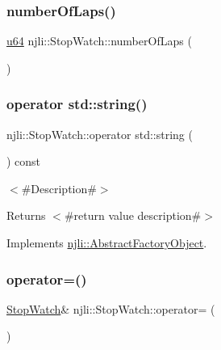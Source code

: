 \subsubsection{\texorpdfstring{number\+Of\+Laps()}{numberOfLaps()}}
{\footnotesize\ttfamily \mbox{\hyperlink{_util_8h_ad758b7a5c3f18ed79d2fcd23d9f16357}{u64}} njli\+::\+Stop\+Watch\+::number\+Of\+Laps (\begin{DoxyParamCaption}{ }\end{DoxyParamCaption})}

\mbox{\label{classnjli_1_1_stop_watch_a841749dbe95a638802a2e7d69e0388c0}} 
\subsubsection{\texorpdfstring{operator std\+::string()}{operator std::string()}}
{\footnotesize\ttfamily njli\+::\+Stop\+Watch\+::operator std\+::string (\begin{DoxyParamCaption}{ }\end{DoxyParamCaption}) const\hspace{0.3cm}{\ttfamily [virtual]}}

$<$\#\+Description\#$>$

\begin{DoxyReturn}{Returns}
$<$\#return value description\#$>$ 
\end{DoxyReturn}


Implements \mbox{\hyperlink{classnjli_1_1_abstract_factory_object_a838f4fa7e65cace6098aab5222892942}{njli\+::\+Abstract\+Factory\+Object}}.

\mbox{\label{classnjli_1_1_stop_watch_a5cb9c0f427eff50c366fc724bd5c36d6}} 
\subsubsection{\texorpdfstring{operator=()}{operator=()}}
{\footnotesize\ttfamily \mbox{\hyperlink{classnjli_1_1_stop_watch}{Stop\+Watch}}\& njli\+::\+Stop\+Watch\+::operator= (\begin{DoxyParamCaption}\item[{const \mbox{\hyperlink{classnjli_1_1_stop_watch}{Stop\+Watch}} \&}]{ }\end{DoxyParamCaption})\hspace{0.3cm}{\ttfamily [protected]}}

